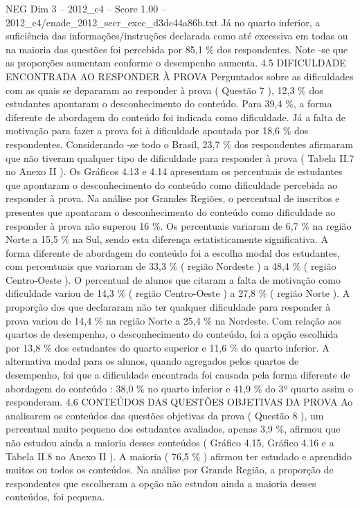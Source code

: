 \begin{textsample}{NEG Dim 3 – 2012\_c4 – Score 1.00 – 2012\_c4/enade\_2012\_secr\_exec\_d3dc44a86b.txt}
Já no quarto inferior, a suficiência das informações/instruções declarada como até excessiva em todas ou na maioria das questões foi percebida por 85,1 \% dos respondentes.
Note -se que as proporções aumentam conforme o desempenho aumenta. 4.5 DIFICULDADE ENCONTRADA AO RESPONDER À PROVA Perguntados sobre as dificuldades com as quais se depararam ao responder à prova ( Questão 7 ), 12,3 \% dos estudantes apontaram o desconhecimento do conteúdo.
Para 39,4 \%, a forma diferente de abordagem do conteúdo foi indicada como dificuldade.
Já a falta de motivação para fazer a prova foi à dificuldade apontada por 18,6 \% dos respondentes.
Considerando -se todo o Brasil, 23,7 \% dos respondentes afirmaram que não tiveram qualquer tipo de dificuldade para responder à prova ( Tabela II.7 no Anexo II ).
Os Gráficos 4.13 e 4.14 apresentam os percentuais de estudantes que apontaram o desconhecimento do conteúdo como dificuldade percebida ao responder à prova.
Na análise por Grandes Regiões, o percentual de inscritos e presentes que apontaram o desconhecimento do conteúdo como dificuldade ao responder à prova não superou 16 \%.
Os percentuais variaram de 6,7 \% na região Norte a 15,5 \% na Sul, sendo esta diferença estatisticamente significativa.
A forma diferente de abordagem do conteúdo foi a escolha modal dos estudantes, com percentuais que variaram de 33,3 \% ( região Nordeste ) a 48,4 \% ( região Centro-Oeste ).
O percentual de alunos que citaram a falta de motivação como dificuldade variou de 14,3 \% ( região Centro-Oeste ) a 27,8 \% ( região Norte ).
A proporção dos que declararam não ter qualquer dificuldade para responder à prova variou de 14,4 \% na região Norte a 25,4 \% na Nordeste.
Com relação aos quartos de desempenho, o desconhecimento do conteúdo, foi a opção escolhida por 13,8 \% dos estudantes do quarto superior e 11,6 \% do quarto inferior.
A alternativa modal para os alunos, quando agregados pelos quartos de desempenho, foi que a dificuldade encontrada foi causada pela forma diferente de abordagem do conteúdo : 38,0 \% no quarto inferior e 41,9 \% do 3º quarto assim o responderam. 4.6 CONTEÚDOS DAS QUESTÕES OBJETIVAS DA PROVA Ao analisarem os conteúdos das questões objetivas da prova ( Questão 8 ), um percentual muito pequeno dos estudantes avaliados, apenas 3,9 \%, afirmou que não estudou ainda a maioria desses conteúdos ( Gráfico 4.15, Gráfico 4.16 e a Tabela II.8 no Anexo II ).
A maioria ( 76,5 \% ) afirmou ter estudado e aprendido muitos ou todos os conteúdos.
Na análise por Grande Região, a proporção de respondentes que escolheram a opção não estudou ainda a maioria desses conteúdos, foi pequena.

\end{textsample}
